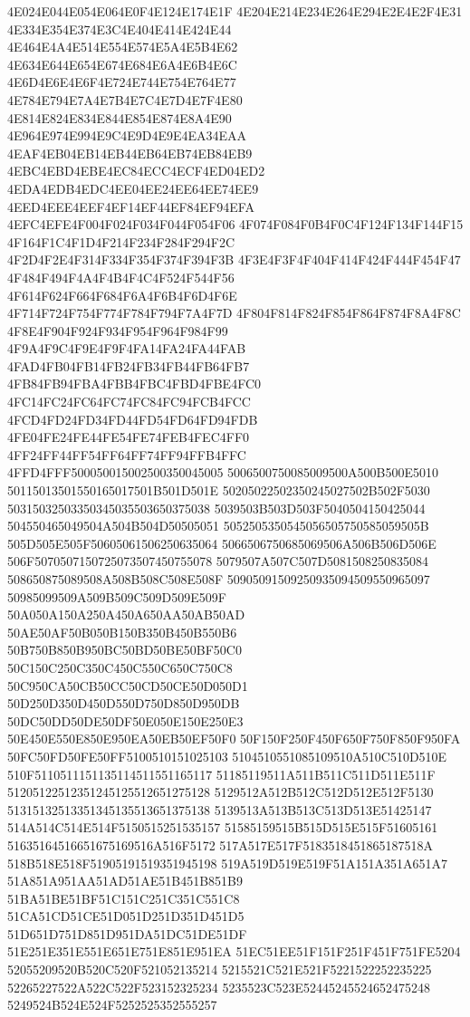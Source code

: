 \cugbk
4E024E044E054E064E0F4E124E174E1F
4E204E214E234E264E294E2E4E2F4E31
4E334E354E374E3C4E404E414E424E44
4E464E4A4E514E554E574E5A4E5B4E62
4E634E644E654E674E684E6A4E6B4E6C
4E6D4E6E4E6F4E724E744E754E764E77
4E784E794E7A4E7B4E7C4E7D4E7F4E80
4E814E824E834E844E854E874E8A4E90
4E964E974E994E9C4E9D4E9E4EA34EAA
4EAF4EB04EB14EB44EB64EB74EB84EB9
4EBC4EBD4EBE4EC84ECC4ECF4ED04ED2
4EDA4EDB4EDC4EE04EE24EE64EE74EE9
4EED4EEE4EEF4EF14EF44EF84EF94EFA
4EFC4EFE4F004F024F034F044F054F06
4F074F084F0B4F0C4F124F134F144F15
4F164F1C4F1D4F214F234F284F294F2C
4F2D4F2E4F314F334F354F374F394F3B
4F3E4F3F4F404F414F424F444F454F47
4F484F494F4A4F4B4F4C4F524F544F56
4F614F624F664F684F6A4F6B4F6D4F6E
4F714F724F754F774F784F794F7A4F7D
4F804F814F824F854F864F874F8A4F8C
4F8E4F904F924F934F954F964F984F99
4F9A4F9C4F9E4F9F4FA14FA24FA44FAB
4FAD4FB04FB14FB24FB34FB44FB64FB7
4FB84FB94FBA4FBB4FBC4FBD4FBE4FC0
4FC14FC24FC64FC74FC84FC94FCB4FCC
4FCD4FD24FD34FD44FD54FD64FD94FDB
4FE04FE24FE44FE54FE74FEB4FEC4FF0
4FF24FF44FF54FF64FF74FF94FFB4FFC
4FFD4FFF500050015002500350045005
5006500750085009500A500B500E5010
50115013501550165017501B501D501E
50205022502350245027502B502F5030
50315032503350345035503650375038
5039503B503D503F5040504150425044
504550465049504A504B504D50505051
5052505350545056505750585059505B
505D505E505F50605061506250635064
5066506750685069506A506B506D506E
506F5070507150725073507450755078
5079507A507C507D5081508250835084
508650875089508A508B508C508E508F
50905091509250935094509550965097
50985099509A509B509C509D509E509F
50A050A150A250A450A650AA50AB50AD
50AE50AF50B050B150B350B450B550B6
50B750B850B950BC50BD50BE50BF50C0
50C150C250C350C450C550C650C750C8
50C950CA50CB50CC50CD50CE50D050D1
50D250D350D450D550D750D850D950DB
50DC50DD50DE50DF50E050E150E250E3
50E450E550E850E950EA50EB50EF50F0
50F150F250F450F650F750F850F950FA
50FC50FD50FE50FF5100510151025103
5104510551085109510A510C510D510E
510F5110511151135114511551165117
51185119511A511B511C511D511E511F
51205122512351245125512651275128
5129512A512B512C512D512E512F5130
51315132513351345135513651375138
5139513A513B513C513D513E51425147
514A514C514E514F5150515251535157
51585159515B515D515E515F51605161
51635164516651675169516A516F5172
517A517E517F5183518451865187518A
518B518E518F51905191519351945198
519A519D519E519F51A151A351A651A7
51A851A951AA51AD51AE51B451B851B9
51BA51BE51BF51C151C251C351C551C8
51CA51CD51CE51D051D251D351D451D5
51D651D751D851D951DA51DC51DE51DF
51E251E351E551E651E751E851E951EA
51EC51EE51F151F251F451F751FE5204
52055209520B520C520F521052135214
5215521C521E521F5221522252235225
52265227522A522C522F523152325234
5235523C523E52445245524652475248
5249524B524E524F5252525352555257
